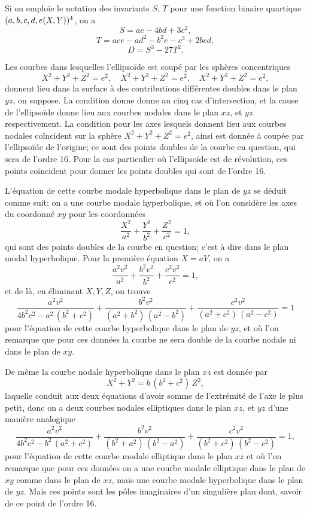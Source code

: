 \documentclass[11pt,a4paper]{article}
\newcommand{\fxn}[2]{(#1\kern-1pt, #2)}
\begin{document}
Si on emploie le notation des invariants $S$, $T$ pour une fonction binaire quartique $(a, b, c, d, e\,\!\fxn{X}{Y})^4$, on a
\[
S = ae - 4bd + 3c^2,
\]
\[
T = ace - ad^2 - b^2e - c^3 + 2bcd,
\]
\[
D = S^3 - 27T^2.
\]

\setcounter{page}{128}

Les courbes dans lesquelles l'ellipsoïde est coupé par les sphères concentriques
\[
X^2 + Y^2 + Z^2 = e^2,\quad X^2 + Y^2 + Z^2 = e^2,\quad X^2 + Y^2 + Z^2 = e^2,
\]
donnent lieu dans la surface à des contributions différentes doubles dans le plan $yz$, on suppose. La condition donne donne au cinq cas d'intersection, et la cause de l'ellipsoïde donne lieu aux courbes nodales dans le plan $xz$, et $yz$ respectivement. La condition pour les axes lesquels donnent lieu aux courbes nodales coïncident sur la sphère $X^2 + Y^2 + Z^2 = e^2$, ainsi est donnée à coupée par l'ellipsoïde de l'origine; ce sont des points doubles de la courbe en question, qui sera de l'ordre 16. Pour la cas particulier où l'ellipsoïde est de révolution, ces points coïncident pour donner les points doubles qui sont de l'ordre 16.

L'équation de cette courbe modale hyperbolique dans le plan de $yz$ se déduit comme suit; on a une courbe modale hyperbolique, et où l'on considère les axes du coordonné $xy$ pour les coordonnées
\[
\frac{X^2}{a^2} + \frac{Y^2}{b^2} + \frac{Z^2}{c^2} = 1,
\]
qui sont des points doubles de la courbe en question; c'est à dire dans le plan modal hyperbolique. Pour la première équation $X = aV$, on a
\[
\frac{a^2v^2}{a^2} + \frac{b^2v^2}{b^2} + \frac{c^2v^2}{c^2} = 1,
\]
et de là, en éliminant $X, Y, Z$, on trouve
\[
\frac{a^2 v^2}{4b^2c^2 - a^2\,(b^2+c^2)} + \frac{b^2v^2}{(a^2+b^2)\,(a^2-b^2)} + \frac{c^2v^2}{(a^2+c^2)\,(a^2-c^2)} = 1
\]
pour l'équation de cette courbe hyperbolique dans le plan de $yz$, et où l'on remarque que pour ces données la courbe ne sera double de la courbe nodale ni dans le plan de $xy$.

De même la courbe nodale hyperbolique dans le plan $xz$ est donnée par
\[
X^2 + Y^2 = b\,(b^2+c^2)\,Z^2,
\]
laquelle conduit aux deux équations d'avoir somme de l'extrémité de l'axe le plus petit, donc on a deux courbes nodales elliptiques dans le plan $xz$, et $yz$ d'une manière analogique
\[
\frac{a^2v^2}{4b^2c^2 - b^2\,(a^2+c^2)} + \frac{b^2v^2}{(b^2+a^2)\,(b^2-a^2)} + \frac{c^2v^2}{(b^2+c^2)\,(b^2-c^2)} = 1,
\]
pour l'équation de cette courbe modale elliptique dans le plan $xz$ et où l'on remarque que pour ces données on a une courbe modale elliptique dans le plan de $xy$ comme dans le plan de $xz$, mais une courbe modale hyperbolique dans le plan de $yz$. Mais ces points sont les pôles imaginaires d'un singulière plan dont, savoir de ce point de l'ordre 16.
\end{document}
